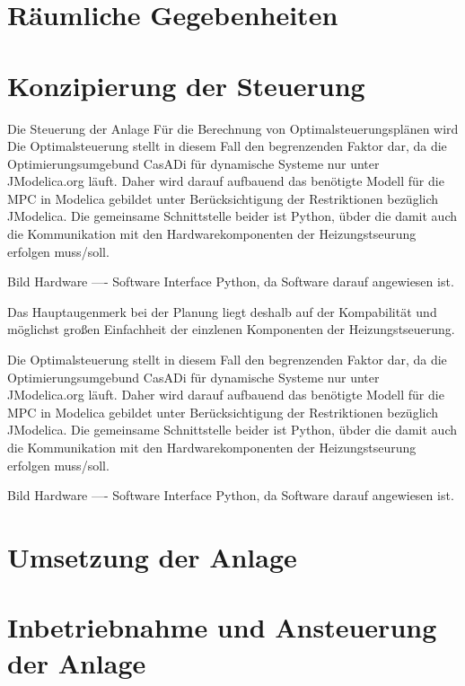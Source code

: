 \section{Räumliche Gegebenheiten}


\section{Konzipierung der Steuerung}
Die Steuerung der Anlage 
Für die Berechnung von Optimalsteuerungsplänen wird 
Die Optimalsteuerung stellt in diesem Fall den begrenzenden Faktor dar, da die Optimierungsumgebund CasADi für dynamische Systeme nur unter JModelica.org läuft. Daher wird darauf aufbauend das benötigte Modell für die MPC in Modelica gebildet unter Berücksichtigung der Restriktionen bezüglich JModelica. Die gemeinsame Schnittstelle beider ist Python, übder die damit auch die Kommunikation mit den Hardwarekomponenten der Heizungstseurung erfolgen muss/soll.

Bild Hardware ---- Software   Interface Python, da Software darauf angewiesen ist.



Das Hauptaugenmerk bei der Planung liegt deshalb auf der Kompabilität und möglichst großen Einfachheit der einzlenen Komponenten der Heizungstseuerung. 

Die Optimalsteuerung stellt in diesem Fall den begrenzenden Faktor dar, da die Optimierungsumgebund CasADi für dynamische Systeme nur unter JModelica.org läuft. Daher wird darauf aufbauend das benötigte Modell für die MPC in Modelica gebildet unter Berücksichtigung der Restriktionen bezüglich JModelica. Die gemeinsame Schnittstelle beider ist Python, übder die damit auch die Kommunikation mit den Hardwarekomponenten der Heizungstseurung erfolgen muss/soll.

Bild Hardware ---- Software   Interface Python, da Software darauf angewiesen ist.

\section{Umsetzung der Anlage}


\section{Inbetriebnahme und Ansteuerung der Anlage}
